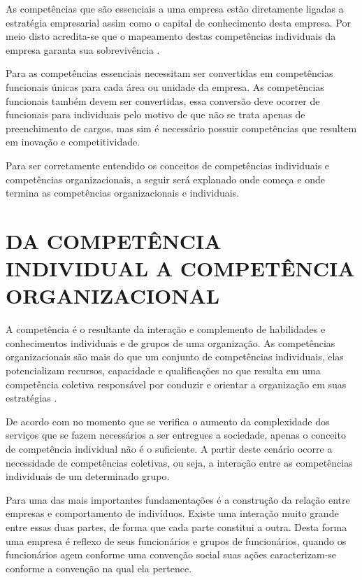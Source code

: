 As competências que são essenciais a uma empresa estão diretamente ligadas a estratégia empresarial assim como o capital de conhecimento desta empresa. Por meio disto acredita-se que o mapeamento destas competências individuais da empresa garanta sua sobrevivência \cite{oliveira2014percepccao}.

Para  as competências essenciais necessitam ser convertidas em competências funcionais únicas para cada área ou unidade da empresa. As competências funcionais também devem ser convertidas, essa conversão deve ocorrer de funcionais para individuais pelo motivo de que não se trata apenas de preenchimento de cargos, mas sim é necessário possuir competências que resultem em inovação e competitividade.

Para ser corretamente entendido os conceitos de competências individuais e competências organizacionais, a seguir será explanado onde começa e onde termina as competências organizacionais e individuais.

\section{DA COMPETÊNCIA INDIVIDUAL A COMPETÊNCIA ORGANIZACIONAL}

A competência é o resultante da interação e complemento de habilidades e conhecimentos individuais e de grupos de uma organização. As competências organizacionais são mais do que um conjunto de competências individuais, elas potencializam recursos, capacidade e qualificações no que resulta em uma competência coletiva responsável por conduzir e orientar a organização em suas estratégias \cite{almeida2015certificaccao}.

De acordo com  no momento que se verifica o aumento da complexidade dos serviços que se fazem necessários a ser entregues a sociedade, apenas o conceito de competência individual não é o suficiente. A partir deste cenário ocorre a necessidade de competências coletivas, ou seja, a interação entre as competências individuais de um determinado grupo.

Para  uma das mais importantes fundamentações é a construção da relação entre empresas e comportamento de indivíduos. Existe uma interação muito grande entre essas duas partes, de forma que cada parte constitui a outra. Desta forma uma empresa é reflexo de seus funcionários e grupos de funcionários, quando os funcionários agem conforme uma convenção social suas ações caracterizam-se conforme a convenção na qual ela pertence.

